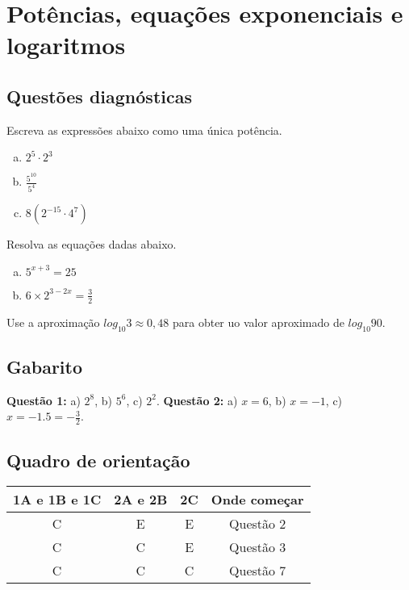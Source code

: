 \documentclass[main_estudante.tex]{subfiles}
\begin{document}
\chapter{Potências, equações exponenciais e logaritmos}

\section{Questões diagnósticas}

\begin{diagnostico}
Escreva as expressões abaixo como uma única potência.
\begin{enumerate}[a)]
  \item $2^5 \cdot 2^3$
  \item $\frac{5^{10}}{5^4}$
  \item $8(2^{-15} \cdot 4^7)$
\end{enumerate}
\end{diagnostico}
  
\begin{diagnostico}
Resolva as equações dadas abaixo.
\begin{enumerate}[a)]
  \item $5^{x+3}=25$
  \item $6 \times 2^{3-2x}=\frac{3}{2}$
\end{enumerate}
\end{diagnostico}

\begin{diagnostico}
Use a aproximação $log_{10} 3 \approx 0,48$ para obter uo valor aproximado de $log_{10} 90$.
\end{diagnostico}

\section{Gabarito}

\textbf{Questão 1:} a) $2^8$, b) $5^6$, c) $2^2$. \textbf{Questão 2:} a) $x=6$, b) $x=-1$, c) $x=-1.5=-\frac{3}{2}$.

\section{Quadro de orientação}

\begin{center}
 \begin{tabular}{|c c c |c|} 
 \hline
 1A e 1B e 1C & 2A e 2B & 2C & Onde começar\\
 \hline
 C & E & E & Questão 2 \\ 
 \hline
 C & C & E & Questão 3 \\ 
 \hline
 C & C & C & Questão 7 \\ 
 \hline
\end{tabular}
\end{center}
\end{document}
